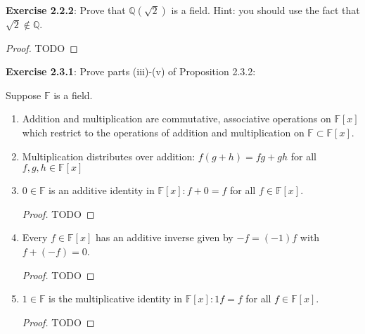 \documentclass[a4paper]{article}
\begin{document}
\begin{myparindent}{0pt}
\textbf{Exercise 2.2.2}:
Prove that $\mathbb{Q}(\sqrt{2})$ is a field. Hint: you should use the fact that
$\sqrt{2} \notin \mathbb{Q}$.

\begin{proof}
TODO
\end{proof}

\textbf{Exercise 2.3.1}:
Prove parts (iii)-(v) of Proposition 2.3.2:

Suppose $\mathbb{F}$ is a field.

\begin{enumerate}[label=(\roman*)]
  \item Addition and multiplication are commutative, associative operations on
  $\mathbb{F}[x]$ which restrict to the operations of addition and multiplication
  on $\mathbb{F} \subset \mathbb{F}[x]$.

  \item Multiplication distributes over addition: $f(g + h) = fg + gh$ for all
  $f, g, h \in \mathbb{F}[x]$

  \item $0 \in \mathbb{F}$ is an additive identity in $\mathbb{F}[x]: f + 0 = f$
  for all $f \in \mathbb{F}[x]$.
    \begin{proof}
    TODO
    \end{proof}

  \item Every $f \in \mathbb{F}[x]$ has an additive inverse given by
  $-f = (-1)f$ with $f + (-f) = 0$.
    \begin{proof}
    TODO
    \end{proof}

  \item $1 \in \mathbb{F}$ is the multiplicative identity in
  $\mathbb{F}[x]: 1f = f$ for all $f \in \mathbb{F}[x]$.
    \begin{proof}
    TODO
    \end{proof}
\end{enumerate}

\end{myparindent}
\end{document}
